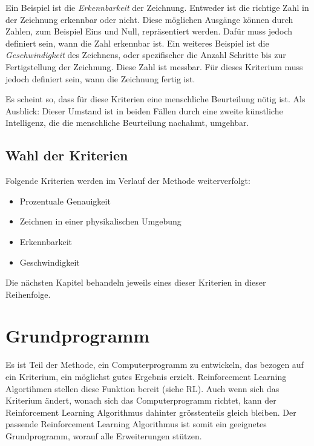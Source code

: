 Ein Beispiel ist die \emph{Erkennbarkeit} der Zeichnung. Entweder ist die
richtige Zahl in der Zeichnung erkennbar oder nicht. Diese möglichen Ausgänge
können durch Zahlen, zum Beispiel Eins und Null, repräsentiert werden. Dafür
muss jedoch definiert sein, wann die Zahl erkennbar ist. 
Ein weiteres Beispiel ist die \emph{Geschwindigkeit} des Zeichnens, oder
spezifischer die Anzahl Schritte bis zur Fertigstellung der Zeichnung. Diese
Zahl ist messbar. Für dieses Kriterium muss jedoch definiert sein, wann die
Zeichnung fertig ist.

Es scheint so, dass für diese Kriterien eine menschliche Beurteilung nötig ist.
Als Ausblick: Dieser Umstand ist in beiden Fällen durch eine zweite
künstliche Intelligenz, die die menschliche Beurteilung nachahmt, umgehbar.

\subsection*{Wahl der Kriterien}
Folgende Kriterien werden im Verlauf der Methode weiterverfolgt:

\begin{itemize}
  \item Prozentuale Genauigkeit
  \item Zeichnen in einer physikalischen Umgebung
  \item Erkennbarkeit 
  \item Geschwindigkeit
\end{itemize}

Die nächsten Kapitel behandeln jeweils eines dieser Kriterien in dieser Reihenfolge.


\section{Grundprogramm}
\label{chap:m_grundprogramm}
Es ist Teil der Methode, ein Computerprogramm zu entwickeln, das bezogen auf ein
Kriterium, ein möglichst gutes Ergebnis erzielt. Reinforcement Learning  %
Algortihmen stellen diese Funktion bereit (siehe RL). Auch wenn sich das  %
Kriterium ändert, wonach sich das Computerprogramm richtet, kann der
Reinforcement Learning Algorithmus dahinter grösstenteils gleich bleiben. Der
passende Reinforcement Learning Algorithmus ist somit ein geeignetes  %
Grundprogramm, worauf alle Erweiterungen stützen. 

